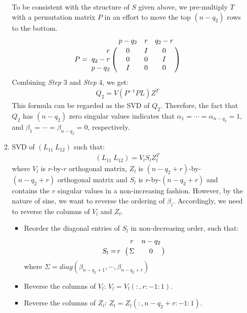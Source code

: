 \begin{enumerate}
\begin{enumerate}
                    To be consistent with the structure of $S$ given above, we pre-multiply $T$ with a permutation matrix $P$ in an effort to move the top $(n-q_2)$ rows to the bottom.
                    \begin{displaymath}
                        P = \bordermatrix{& p-q_2 & r & q_2-r \cr
                            \hfill r & 0 & I & 0 \cr
                            \hfill q_2-r & 0 & 0 & I \cr
                            \hfill p-q_2 & I & 0 & 0}
                    \end{displaymath}
                    Combining \textit{Step} 3 and \textit{Step} 4, we get:
                        \begin{align} \label{eq-q_2-case2}
                            Q_2 = V(P^{-1}PL)Z^{T}
                        \end{align}
                    This formula can be regarded as the SVD of $Q_2$. Therefore, the fact that $Q_2$ has $(n-q_2)$ zero singular values indicates that $\alpha_{1} = \cdots = \alpha_{n-q_2} = 1$, and $\beta_{1} = \cdots = \beta_{n-q_2} = 0$, respectively. 
                \item SVD of $(L_{11} \ L_{12})$ such that:
                    \begin{align} \label{eq-l-svd}
                        (L_{11} \ L_{12}) = V_{l}S_{l}Z_{l}^{T}
                    \end{align}
                    where $V_{l}$ is $r$-by-$r$ orthogonal matrix, $Z_{l}$ is $(n-q_2+r)$-by-$(n-q_2+r)$ orthogonal matrix and $S_{l}$ is $r$-by-$(n-q_2+r)$ and contains the $r$ singular values in a non-increasing fashion. However, by the nature of sine, we want to reverse the ordering of $\beta_i$. Accordingly, we need to reverse the columns of $V_{l}$ and $Z_{l}$.
                        \begin{itemize}
                            \item Reorder the diagonal entries of $S_{l}$ in non-decreasing order, such that:
                            \begin{displaymath}
                                S_{l} = \bordermatrix{ & r & n-q_2\cr
                                    \hfill r & \Sigma & 0}
                            \end{displaymath} where $\Sigma = diag(\beta_{n-q_2+1}, \cdots, \beta_{n-q_2+r})$
                            \item Reverse the columns of $V_l$: $V_l = V_l(:,r:-1:1)$. 
                            \item Reverse the columns of $Z_l$: $Z_l = Z_l(:,n-q_2+r:-1:1)$. 

\end{itemize}
\end{enumerate}
\end{enumerate}
